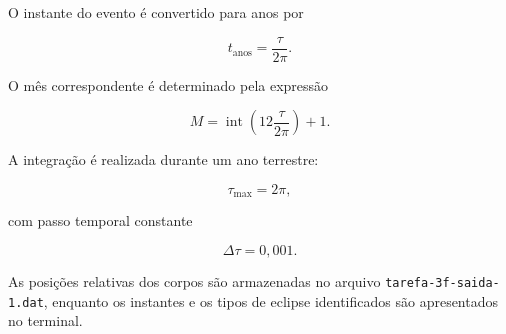 \documentclass[12pt,a4paper]{article}
\begin{document}
O instante do evento é convertido para anos por

\begin{equation}
    t_{\mathrm{anos}}=\frac{\tau}{2\pi}.
\end{equation}

O mês correspondente é determinado pela expressão

\begin{equation}
    M=
    \operatorname{int}
    \left(
    12\frac{\tau}{2\pi}
    \right)+1.
\end{equation}

A integração é realizada durante um ano terrestre:

\begin{equation}
    \tau_{\max}=2\pi,
\end{equation}

com passo temporal constante

\begin{equation}
    \Delta\tau=0,001.
\end{equation}

As posições relativas dos corpos são armazenadas no arquivo \texttt{tarefa-3f-saida-1.dat}, enquanto os instantes e os tipos de eclipse identificados são apresentados no terminal.
\end{document}
